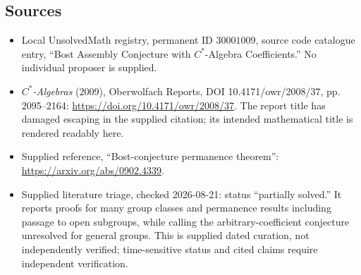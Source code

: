 \documentclass[11pt]{article}
\begin{document}
\subsection{Sources}
\begin{itemize}
\item Local UnsolvedMath registry, permanent ID \(30001009\), source code catalogue entry, ``Bost Assembly Conjecture with \(C^*\)-Algebra Coefficients.'' No individual proposer is supplied.
\item \emph{\(C^*\)-Algebras} (2009), Oberwolfach Reports, DOI 10.4171/owr/2008/37, pp. 2095--2164: \url{https://doi.org/10.4171/owr/2008/37}. The report title has damaged escaping in the supplied citation; its intended mathematical title is rendered readably here.
\item Supplied reference, ``Bost-conjecture permanence theorem'': \url{https://arxiv.org/abs/0902.4339}.
\item Supplied literature triage, checked 2026-08-21: status ``partially solved.'' It reports proofs for many group classes and permanence results including passage to open subgroups, while calling the arbitrary-coefficient conjecture unresolved for general groups. This is supplied dated curation, not independently verified; time-sensitive status and cited claims require independent verification.
\end{itemize}
\end{document}
